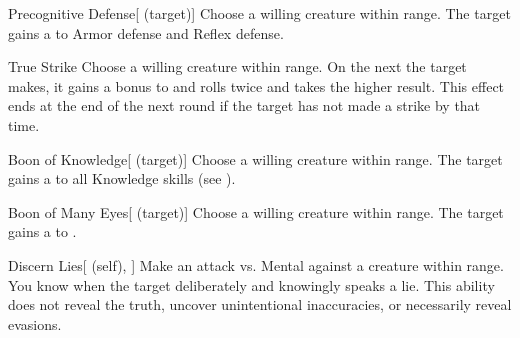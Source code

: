 \lowercase{\hypertarget{spell:Precognitive Defense}{}}\label{spell:Precognitive Defense}
\begin{attuneability}[\nth{1}]{\hypertarget{spell:Precognitive Defense}{Precognitive Defense}}[ (target)]
Choose a willing creature within \rngclose range.
The target gains a   to Armor defense and Reflex defense.
\end{attuneability}
\vspace{0.25em}



\lowercase{\hypertarget{spell:True Strike}{}}\label{spell:True Strike}
\begin{apability}[\nth{1}]{\hypertarget{spell:True Strike}{True Strike}}
Choose a willing creature within \rngclose range.
On the next  the target makes, it gains a  bonus to  and rolls twice and takes the higher result.
This effect ends at the end of the next round if the target has not made a strike by that time.
\end{apability}
\vspace{0.25em}



\lowercase{\hypertarget{spell:Boon of Knowledge}{}}\label{spell:Boon of Knowledge}
\begin{attuneability}[\nth{2}]{\hypertarget{spell:Boon of Knowledge}{Boon of Knowledge}}[ (target)]
Choose a willing creature within \rngclose range.
The target gains a   to all Knowledge skills (see ).
\end{attuneability}
\vspace{0.25em}



\lowercase{\hypertarget{spell:Boon of Many Eyes}{}}\label{spell:Boon of Many Eyes}
\begin{attuneability}[\nth{2}]{\hypertarget{spell:Boon of Many Eyes}{Boon of Many Eyes}}[ (target)]
Choose a willing creature within \rngclose range.
The target gains a   to .
\end{attuneability}
\vspace{0.25em}



\lowercase{\hypertarget{spell:Discern Lies}{}}\label{spell:Discern Lies}
\begin{attuneability}[\nth{2}]{\hypertarget{spell:Discern Lies}{Discern Lies}}[ (self), ]
Make an attack vs. Mental against a creature within \rngmed range.
\hit You know when the target deliberately and knowingly speaks a lie.
This ability does not reveal the truth, uncover unintentional inaccuracies, or necessarily reveal evasions.
\end{attuneability}
\vspace{0.25em}



